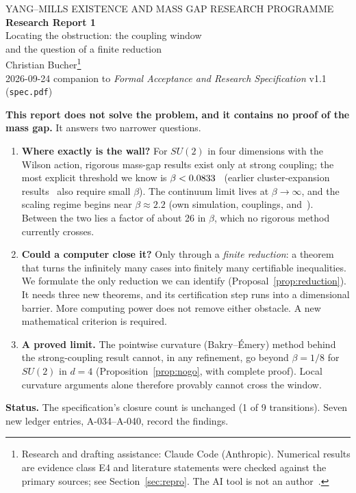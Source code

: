 \documentclass[11pt,a4paper]{article}
\newcommand{\idref}[1]{\textsf{#1}}
\begin{document}
\begin{center}
{\sffamily\small YANG--MILLS EXISTENCE AND MASS GAP \textperiodcentered{} RESEARCH PROGRAMME}\\[8pt]
{\LARGE\bfseries Research Report 1}\\[4pt]
{\Large Locating the obstruction: the coupling window\\and the question of a finite reduction}\\[10pt]
{\large Christian Bucher}\footnote{Research and drafting assistance: Claude Code (Anthropic). Numerical results are evidence class E4 and literature statements were checked against the primary sources; see Section~\ref{sec:repro}. The AI tool is not an author~\cite{COPE23}.}\\[4pt]
{\small 2026-09-24 \textperiodcentered{} companion to \emph{Formal Acceptance and Research Specification} v1.1 (\texttt{spec.pdf})}
\end{center}

\begin{keybox}[title=Result in brief]
\textbf{This report does not solve the problem, and it contains no proof of the mass gap.} It answers two narrower questions.
\begin{enumerate}[leftmargin=1.4em]
\item \textbf{Where exactly is the wall?} For $SU(2)$ in four dimensions with the Wilson action, rigorous mass-gap results exist only at strong coupling; the most explicit threshold we know is $\beta<0.0833$~\cite{SZZ23} (earlier cluster-expansion results~\cite{OSe78} also require small $\beta$). The continuum limit lives at $\beta\to\infty$, and the scaling regime begins near $\beta\approx2.2$ (own simulation, \NumRuns{} couplings, and~\cite{AT21}). Between the two lies a factor of about 26 in $\beta$, which no rigorous method currently crosses.
\item \textbf{Could a computer close it?} Only through a \emph{finite reduction}: a theorem that turns the infinitely many cases into finitely many certifiable inequalities. We formulate the only reduction we can identify (Proposal~\ref{prop:reduction}). It needs three new theorems, and its certification step runs into a dimensional barrier. More computing power does not remove either obstacle. A new mathematical criterion is required.
\item \textbf{A proved limit.} The pointwise curvature (Bakry--Émery) method behind the strong-coupling result cannot, in any refinement, go beyond $\beta=1/8$ for $SU(2)$ in $d=4$ (Proposition~\ref{prop:nogo}, with complete proof). Local curvature arguments alone therefore provably cannot cross the window.
\end{enumerate}
\textbf{Status.} The specification's closure count is unchanged (1 of 9 transitions). Seven new ledger entries, \idref{A-034}--\idref{A-040}, record the findings.
\end{keybox}
\end{document}
